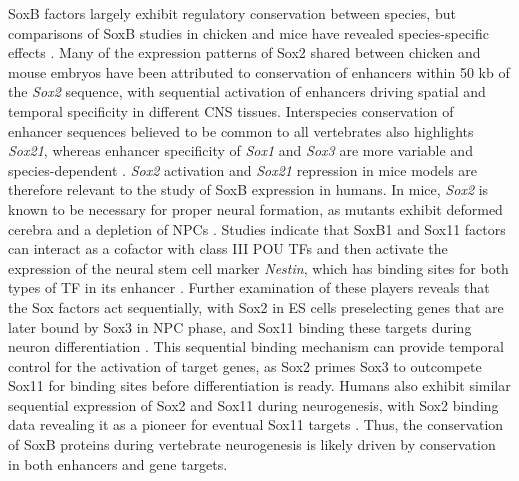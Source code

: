 \documentclass[withindex,glossary]{cam-thesis}
\begin{document}
SoxB factors largely exhibit regulatory conservation between species,
but comparisons of SoxB studies in chicken and mice have revealed
species-specific effects . Many of the
expression patterns of Sox2 shared between chicken and mouse embryos
have been attributed to conservation of enhancers within 50 kb of the
\emph{Sox2} sequence, with sequential activation of enhancers driving
spatial and temporal specificity in different CNS tissues. Interspecies
conservation of enhancer sequences believed to be common to all
vertebrates also highlights \emph{Sox21}, whereas enhancer specificity
of \emph{Sox1} and \emph{Sox3} are more variable and species-dependent
. \emph{Sox2}
activation and \emph{Sox21} repression in mice models are therefore
relevant to the study of SoxB expression in humans. In mice, \emph{Sox2}
is known to be necessary for proper neural formation, as mutants exhibit
deformed cerebra and a depletion of NPCs . Studies
indicate that SoxB1 and Sox11 factors can interact as a cofactor with
class III POU TFs and then activate the expression of the neural stem
cell marker \emph{Nestin}, which has binding sites for both types of TF
in its enhancer . Further examination of these
players reveals that the Sox factors act sequentially, with Sox2 in ES
cells preselecting genes that are later bound by Sox3 in NPC phase, and
Sox11 binding these targets during neuron differentiation . This sequential binding mechanism can provide temporal
control for the activation of target genes, as Sox2 primes Sox3 to
outcompete Sox11 for binding sites before differentiation is ready.
Humans also exhibit similar sequential expression of Sox2 and Sox11
during neurogenesis, with Sox2 binding data revealing it as a pioneer
for eventual Sox11 targets .
Thus, the conservation of SoxB proteins during vertebrate neurogenesis
is likely driven by conservation in both enhancers and gene targets.
\end{document}
